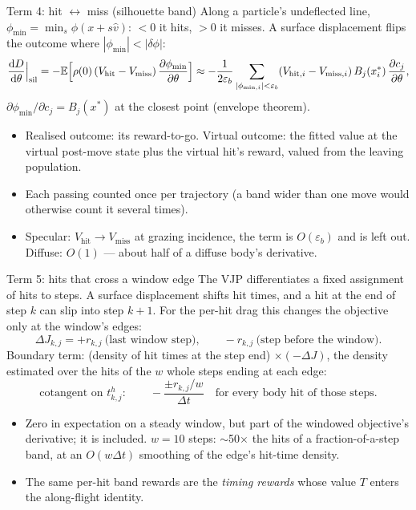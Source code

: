\begin{frame}{Term 4: hit $\leftrightarrow$ miss (silhouette band)}
Along a particle's undeflected line, $\phi_{\min} = \min_s\phi(x + s\hat v)$: $<0$ it hits,
$>0$ it misses.  A surface displacement flips the outcome where $|\phi_{\min}| < |\delta\phi|$:
\[
\frac{\mathrm{d} D}{\mathrm{d}\theta}\Big|_{\mathrm{sil}} = -\mathbb{E}\Big[\rho(0)\,(V_{\mathrm{hit}} - V_{\mathrm{miss}})\,\frac{\partial\phi_{\min}}{\partial\theta}\Big]
\approx -\frac{1}{2\varepsilon_b}\sum_{|\phi_{\min,i}|<\varepsilon_b}(V_{\mathrm{hit},i} - V_{\mathrm{miss},i})\,B_j(x^*_i)\,\frac{\partial c_j}{\partial\theta},
\]
$\partial\phi_{\min}/\partial c_j = B_j(x^*)$ at the closest point (envelope theorem).
\begin{itemize}
\item Realised outcome: its reward-to-go.  Virtual outcome: the fitted value at the virtual
  post-move state plus the virtual hit's reward, valued from the leaving population.
\item Each passing counted once per trajectory (a band wider than one move would otherwise
  count it several times).
\item Specular: $V_{\mathrm{hit}}\to V_{\mathrm{miss}}$ at grazing incidence, the term is $O(\varepsilon_b)$
  and is left out.  Diffuse: $O(1)$ --- about half of a diffuse body's derivative.
\end{itemize}
\end{frame}

\begin{frame}{Term 5: hits that cross a window edge}
The VJP differentiates a fixed assignment of hits to steps.  A surface displacement shifts
hit times, and a hit at the end of step $k$ can slip into step $k+1$.  For the per-hit drag
this changes the objective only at the window's edges:
\[
\Delta J_{k,j} = +r_{k,j}\ \text{(last window step)},\qquad -r_{k,j}\ \text{(step before the window)} .
\]
Boundary term: (density of hit times at the step end) $\times(-\Delta J)$, the density estimated
over the hits of the $w$ whole steps ending at each edge:
\[
\text{cotangent on } t^h_{k,j}:\qquad -\frac{\pm r_{k,j}/w}{\Delta t}
\quad\text{for every body hit of those steps.}
\]
\begin{itemize}
\item Zero in expectation on a steady window, but part of the windowed objective's derivative;
  it is included.  $w = 10$ steps: $\sim$50$\times$ the hits of a fraction-of-a-step band, at an
  $O(w\Delta t)$ smoothing of the edge's hit-time density.
\item The same per-hit band rewards are the \emph{timing rewards} whose value $T$ enters the
  along-flight identity.
\end{itemize}
\end{frame}

